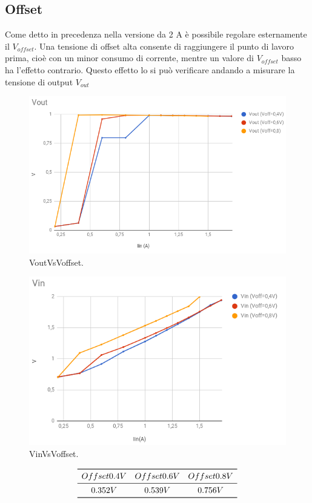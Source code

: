 \subsection{Offset}
Come detto in precedenza nella versione da 2 A è possibile regolare esternamente il $V_{offset}$. 
Una tensione di offset alta consente di raggiungere il punto di lavoro prima, cioè con un minor consumo di corrente, mentre un valore di $V_{offset}$ basso ha l'effetto contrario. Questo effetto lo si può verificare andando a misurare la tensione di output $V_{out}$
\begin{figure}
\centering
\includegraphics[scale=.4]{Immagini/VoutVsVoffset}
\caption{VoutVsVoffset.}
\label{VoutVsVoffset}
\end{figure}

\begin{figure}
\centering
\includegraphics[scale=.4]{Immagini/VinVsVoffset}
\caption{VinVsVoffset.}
\label{VinVsVoffset}
\end{figure}
\[
\begin{array}{ccc}

\toprule
Offset 0.4 V & Offset 0.6 V & Offset 0.8 V  \\

\midrule

0.352 V & 0.539 V & 0.756 V \\

\bottomrule
\end{array}
\]

